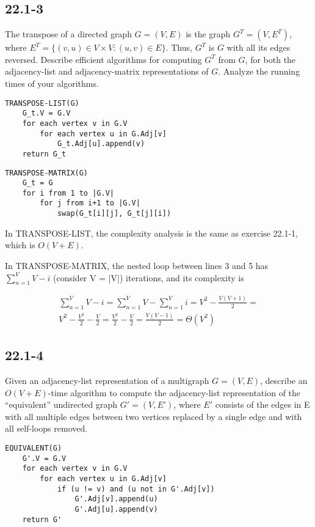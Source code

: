 \documentclass[11pt]{article}
\begin{document}
\subsection*{22.1-3}

The transpose of a directed graph $G = (V, E)$  is the graph $G^T = (V, E^T)$, where $E^T = \{ (v,u) \in V \times V : (u,v) \in E\}$. Thus, $G^T$ is $G$ with all its edges reversed. Describe efficient algorithms for computing $G^T$ from $G$, for both the adjacency-list and adjacency-matrix representations of $G$. Analyze the running times of your algorithms.

\begin{lstlisting}
TRANSPOSE-LIST(G)
	G_t.V = G.V
	for each vertex v in G.V
		for each vertex u in G.Adj[v]
			G_t.Adj[u].append(v)
	return G_t
\end{lstlisting}

\begin{lstlisting}
TRANSPOSE-MATRIX(G)
	G_t = G
	for i from 1 to |G.V|
		for j from i+1 to |G.V| 
			swap(G_t[i][j], G_t[j][i])
\end{lstlisting}

In TRANSPOSE-LIST, the complexity analysis is the same as exercise 22.1-1, which is $O(V+E)$.

In TRANSPOSE-MATRIX, the nested loop between lines 3 and 5 has $\sum_{n=1}^{V} V - i$ (consider V = |V|) iterations, and its complexity is

\begin{equation}
\begin{split}
\sum_{n=1}^{V} V - i = \sum_{n=1}^{V} V - \sum_{n=1}^{V} i = V^2 - \frac{V(V+1)}{2} =\\V^2 - \frac{V^2}{2} - \frac{V}{2} = \frac{V^2}{2} - \frac{V}{2} = \frac{V(V-1)}{2} = \Theta(V^2)
\end{split}
\end{equation}


\subsection*{22.1-4}

Given an adjacency-list  representation  of a multigraph $G = (V, E)$, describe an $O(V + E)$-time  algorithm  to  compute  the  adjacency-list  representation  of  the “equivalent” undirected graph $G ' = (V, E')$, where $E'$ consists of the edges in E with all multiple edges between two vertices replaced by a single edge and with all self-loops removed.

\begin{lstlisting}
EQUIVALENT(G)
	G'.V = G.V
	for each vertex v in G.V
		for each vertex u in G.Adj[v]
			if (u != v) and (u not in G'.Adj[v])
				G'.Adj[v].append(u)
				G'.Adj[u].append(v)
	return G'
\end{lstlisting}
\end{document}
